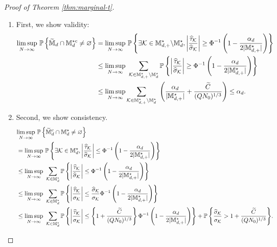 \documentclass[12pt]{article}
\begin{document}
\begin{proof}[Proof of Theorem \ref{thm:marginal-t}]
\begin{enumerate}
    \item First, we show validity:
    \begin{align*}
        \underset{N\to\infty}{\lim\sup}~{\mathbb{P}}\left\{\widetilde{{\mathbb{M}}}_{d}\cap{\mathbb{M}}^{\star c}_d\neq \varnothing\right\} 
        &= \underset{N\to\infty}{\lim\sup}~{\mathbb{P}}\left\{\exists {\mathcal{K}}\in{\mathbb{M}}^{\star }_{d,+}\backslash{\mathbb{M}}^{\star }_{d}, \left|\frac{{\widehat{\tau}}_{{\mathcal{K}}}}{\widehat{\sigma}_{\mathcal{K}}}\right|\ge\Phi^{-1}\left(1-\frac{\alpha_d}{2|{\mathbb{M}}^{\star }_{d,+}|} \right)\right\}\\
        &\le\underset{N\to\infty}{\lim\sup}~ \sum_{{\mathcal{K}}\in{\mathbb{M}}^{\star }_{d,+}\backslash{\mathbb{M}}^{\star }_{d}} {\mathbb{P}}\left\{\left|\frac{{\widehat{\tau}}_{{\mathcal{K}}}}{\widehat{\sigma}_{\mathcal{K}}}\right|\ge\Phi^{-1}\left(1-\frac{\alpha_d}{2|{\mathbb{M}}^{\star }_{d,+}|} \right)\right\}\\
        &\le \underset{N\to\infty}{\lim\sup}\sum_{{\mathcal{K}}\in{\mathbb{M}}^{\star }_{d,+}\backslash{\mathbb{M}}^{\star }_{d}} ~\left(\frac{\alpha_d}{|{\mathbb{M}}^{\star }_{d,+}|} + \frac{\widetilde{C}}{(QN_0)^{1/3}}\right)
         \le \alpha_d.
    \end{align*}
    \item Second, we show consistency.
    \begin{align*}
        &\underset{N\to\infty}{\lim\sup}~{\mathbb{P}}\left\{\widetilde{{\mathbb{M}}}^c_{d}\cap{\mathbb{M}}^{\star }_d\neq \varnothing\right\} \\
        &= \underset{N\to\infty}{\lim\sup}~{\mathbb{P}}\left\{\exists {\mathcal{K}}\in {\mathbb{M}}^{\star }_{d}, \left|\frac{{\widehat{\tau}}_{{\mathcal{K}}}}{\widehat{\sigma}_{\mathcal{K}}}\right|\le\Phi^{-1}\left(1-\frac{\alpha_d}{2|{\mathbb{M}}^{\star }_{d,+}|} \right)\right\}\\
        &\le \underset{N\to\infty}{\lim\sup}~ \sum_{{\mathcal{K}}\in{\mathbb{M}}^{\star }_{d}} {\mathbb{P}}\left\{\left|\frac{{\widehat{\tau}}_{{\mathcal{K}}}}{\widehat{\sigma}_{\mathcal{K}}}\right|\le\Phi^{-1}\left(1-\frac{\alpha_d}{2|{\mathbb{M}}^{\star }_{d,+}|} \right)\right\}\\
        &\le \underset{N\to\infty}{\lim\sup}~ \sum_{{\mathcal{K}}\in{\mathbb{M}}^{\star }_{d}} {\mathbb{P}}\left\{\left|\frac{{\widehat{\tau}}_{{\mathcal{K}}}}{ {\sigma}_{\mathcal{K}}}\right|\le\frac{\widehat{\sigma}_{\mathcal{K}}}{\sigma_{\mathcal{K}}}\Phi^{-1}\left(1-\frac{\alpha_d}{2|{\mathbb{M}}^{\star }_{d,+}|} \right)\right\}\\
        &\le \underset{N\to\infty}{\lim\sup}~ \sum_{{\mathcal{K}}\in{\mathbb{M}}^{\star }_{d}} {\mathbb{P}}\left\{\left|\frac{{\widehat{\tau}}_{{\mathcal{K}}}}{ {\sigma}_{\mathcal{K}}}\right|\le\left\{1+\frac{\widetilde{C}}{(QN_0)^{1/3}}\right\}\Phi^{-1}\left(1-\frac{\alpha_d}{2|{\mathbb{M}}^{\star }_{d,+}|} \right)\right\} + {{\mathbb{P}}\left\{\frac{\widehat{\sigma}_{\mathcal{K}}}{\sigma_{\mathcal{K}}}> 1+\frac{\widetilde{C}}{(QN_0)^{1/3}}\right\}}.
    \end{align*}

\end{enumerate}
\end{proof}
\end{document}

